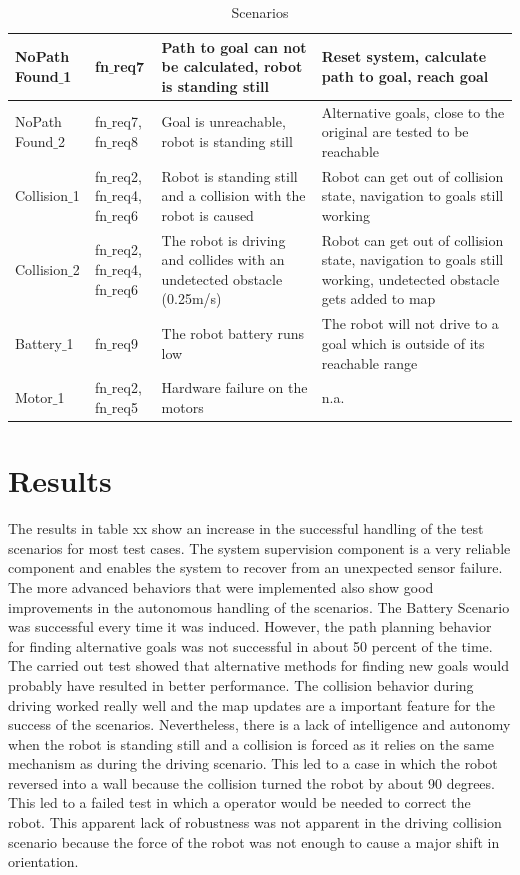   	
\begin{table}[h!]
	\caption{Scenarios}
	\begin{tabular}{| m{} | m{}| m{} | m{}|} 
  	\hline	
  	NoPath Found$\_$1 & fn$\_$req7 & Path to goal can not be calculated, robot is standing still &  
Reset system, calculate path to goal, reach goal \\
	\hline
	NoPath Found$\_$2 & fn$\_$req7, fn$\_$req8 & Goal is unreachable, robot is standing still & Alternative goals, close to the original are tested to be reachable \\
	\hline
	Collision$\_$1 & fn$\_$req2, fn$\_$req4, fn$\_$req6 & Robot is standing still and a collision with the robot is caused & Robot can get out of collision state, navigation to goals still working \\
	\hline
	Collision$\_$2 & fn$\_$req2, fn$\_$req4, fn$\_$req6 & The robot is driving and collides with an undetected obstacle (0.25m/s) &  
Robot can get out of collision state, navigation to goals still working, undetected obstacle gets added to map \\
	\hline
	Battery$\_$1 & fn$\_$req9 & The robot battery runs low & The robot will not drive to a goal which is outside of its reachable range \\
	\hline
	Motor$\_$1 & fn$\_$req2, fn$\_$req5 & Hardware failure on the motors & n.a. \\
	\hline
		
	\end{tabular}
\end{table}

\section{Results}

The results in table xx show an increase in the successful handling of the test scenarios for most test cases. The system supervision component is a very reliable component and enables the system to recover from an unexpected sensor failure. The more advanced behaviors that were implemented also show good improvements in the autonomous handling of the scenarios. The Battery Scenario was successful every time it was induced. However, the path planning behavior for finding alternative goals was not successful in about 50 percent of the time. The carried out test showed that alternative methods for finding new goals would probably have resulted in better performance. The collision behavior during driving worked really well and the map updates are a important feature for the success of the scenarios. Nevertheless, there is a lack of intelligence and autonomy when the robot is standing still and a collision is forced as it relies on the same mechanism as during the driving scenario. This led to a case in which the robot reversed into a wall because the collision turned the robot by about 90 degrees. This led to a failed test in which a operator would be needed to correct the robot. This apparent lack of robustness was not apparent in the driving collision scenario because the force of the robot was not enough to cause a major shift in orientation. 


